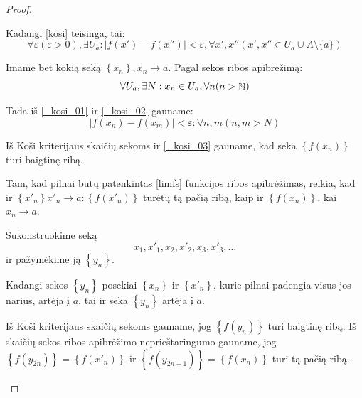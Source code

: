 \begin{prop}
\begin{proof}
\begin{description}
        Kadangi \ref{kosi} teisinga, tai:
        \begin{equation}
          \forall \varepsilon (\varepsilon > 0), \exists U_{a} :
          | f(x') - f(x'') | < \varepsilon, \forall x',x''
          (x',x'' \in U_{a} \cup A \setminus \{a\})
          \label{_kosi_01}
        \end{equation}

        Imame bet kokią seką $\left\{ x_{n} \right\}, x_{n} \to a$. Pagal
        sekos ribos apibrėžimą:
        \begin{equation}
          \forall U_{a}, \exists N : x_{n} \in U_{a}, \forall n (n > \mathop{\mathbb{N}})
          \label{_kosi_02}
        \end{equation}

        Tada iš \ref{_kosi_01} ir \ref{_kosi_02} gauname:
        \begin{equation}
          | f(x_{n}) - f(x_{m}) | < \varepsilon : \forall n, m (n,m > N)
          \label{_kosi_03}
        \end{equation}

        Iš Koši kriterijaus skaičių sekoms ir \ref{_kosi_03} gauname, kad
        seka $\left\{ f(x_{n}) \right\}$ turi baigtinę ribą.

        Tam, kad pilnai būtų patenkintas \ref{limfs} funkcijos ribos 
        apibrėžimas, reikia, kad ir 
        $\left\{ x'_{n} \right\} x'_{n} \to a : \left\{ f(x'_{n}) \right\}$
        turėtų tą pačią ribą, kaip ir $\left\{ f(x_{n}) \right\}$, 
        kai $x_{n} \to a$.

        Sukonstruokime seką
        \begin{equation*}
          x_{1},x'_{1},x_{2},x'_{2},x_{3},x'_{3},\ldots
        \end{equation*}
        ir pažymėkime ją $\left\{ y_{n} \right\}$.

        Kadangi sekos $\left\{ y_{n} \right\}$ posekiai 
        $\left\{ x_{n} \right\}$ ir $\left\{ x'_{n} \right\}$, kurie pilnai 
        padengia visus jos narius, artėja į $a$, tai ir seka 
        $\left\{ y_{n} \right\}$ artėja į $a$.

        Iš Koši kriterijaus skaičių sekoms gauname, jog 
        $\left\{ f(y_{n}) \right\}$ turi baigtinę ribą. Iš skaičių sekos
        ribos apibrėžimo neprieštaringumo gauname, jog 
        $\left\{ f(y_{2n}) \right\} = \left\{ f(x'_{n}) \right\}$ ir
        $\left\{ f(y_{2n+1}) \right\} = \left\{ f(x_{n}) \right\}$ turi tą
        pačią ribą.

    \end{description}
  \end{proof}
\end{prop}

